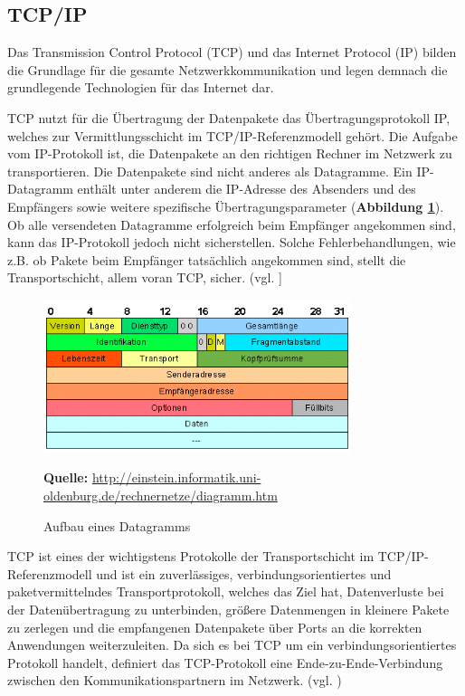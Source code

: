 \newpage
\subsection{TCP/IP}
\label{sec:tcp/ip}
Das Transmission Control Protocol (TCP) und das Internet Protocol (IP) bilden die Grundlage für die gesamte Netzwerkkommunikation und legen demnach die grundlegende Technologien für das Internet dar.\bigskip

TCP nutzt für die Übertragung der Datenpakete das Übertragungsprotokoll IP, welches zur Vermittlungsschicht im TCP/IP-Referenzmodell gehört. Die Aufgabe vom IP-Protokoll ist, die Datenpakete an den richtigen Rechner im Netzwerk zu transportieren. Die Datenpakete sind nicht anderes als Datagramme. Ein IP-Datagramm enthält unter anderem die IP-Adresse des Absenders und des Empfängers sowie weitere spezifische Übertragungsparameter (\textbf {Abbildung \ref{fig:datagramms}}). Ob alle versendeten Datagramme erfolgreich beim Empfänger angekommen sind, kann das IP-Protokoll jedoch nicht sicherstellen. Solche Fehlerbehandlungen, wie z.B. ob Pakete beim Empfänger tatsächlich angekommen sind, stellt die Transportschicht, allem voran TCP, sicher. (vgl. \cite{Kar.o.J.}] 

\begin{figure}[H]
  \begin{center}
    \includegraphics[width=9cm]{img/Datagramms.png}
	\caption{Aufbau eines Datagramms}
	\footnotesize\sffamily\textbf{Quelle:} \url{http://einstein.informatik.uni-oldenburg.de/rechnernetze/diagramm.htm} 
	\label{fig:datagramms}
  \end{center}   
\end{figure}

TCP ist eines der wichtigstens Protokolle der Transportschicht im TCP/IP-Referenzmodell und ist ein zuverlässiges, verbindungsorientiertes und paketvermittelndes Transportprotokoll, welches das Ziel hat, Datenverluste bei der Datenübertragung zu unterbinden, größere Datenmengen in kleinere Pakete zu zerlegen und die empfangenen Datenpakete über Ports an die korrekten Anwendungen weiterzuleiten. Da sich es bei TCP um ein verbindungsorientiertes Protokoll handelt, definiert das TCP-Protokoll eine Ende-zu-Ende-Verbindung zwischen den Kommunikationspartnern im Netzwerk. (vgl. \cite{o.V.2019})\bigskip

